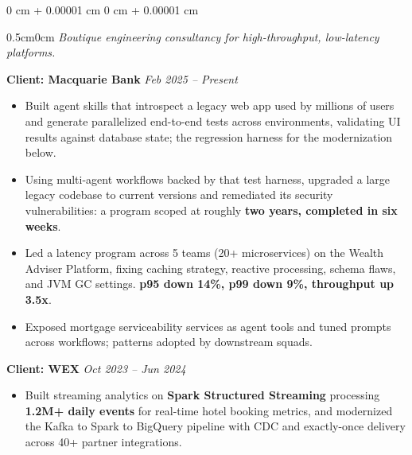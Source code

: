 \documentclass[10pt, letterpaper]{article}
\newenvironment{onecolentry}{
    \begin{adjustwidth}{
        0 cm + 0.00001 cm
    }{
        0 cm + 0.00001 cm
    }
}{
    \end{adjustwidth}
} %
\begin{document}
        \vspace{0.10 cm}
        \begin{onecolentry}
            \begin{adjustwidth}{0.5cm}{0cm}
            \textit{Boutique engineering consultancy for high-throughput, low-latency platforms.}
            \end{adjustwidth}

            \vspace{0.10 cm}
            \hspace{0.5cm}\textbf{Client: Macquarie Bank} \hfill \textit{Feb 2025 -- Present}
            \begin{itemize}[
                topsep=0.10 cm,
                parsep=0.10 cm,
                partopsep=0pt,
                itemsep=0pt,
                leftmargin=0 cm + 10pt + 0.5cm
            ]
                \item Built agent skills that introspect a legacy web app used by millions of users and generate parallelized end-to-end tests across environments, validating UI results against database state; the regression harness for the modernization below.
                \item Using multi-agent workflows backed by that test harness, upgraded a large legacy codebase to current versions and remediated its security vulnerabilities: a program scoped at roughly \textbf{two years, completed in six weeks}.
                \item Led a latency program across 5 teams (20+ microservices) on the Wealth Adviser Platform, fixing caching strategy, reactive processing, schema flaws, and JVM GC settings. \textbf{p95 down 14\%, p99 down 9\%, throughput up 3.5x}.
                \item Exposed mortgage serviceability services as agent tools and tuned prompts across workflows; patterns adopted by downstream squads.
            \end{itemize}

            \vspace{0.10 cm}
            \hspace{0.5cm}\textbf{Client: WEX} \hfill \textit{Oct 2023 -- Jun 2024}
            \begin{itemize}[
                topsep=0.10 cm,
                parsep=0.10 cm,
                partopsep=0pt,
                itemsep=0pt,
                leftmargin=0 cm + 10pt + 0.5cm
            ]
            \item Built streaming analytics on \textbf{Spark Structured Streaming} processing \textbf{1.2M+ daily events} for real-time hotel booking metrics, and modernized the Kafka to Spark to BigQuery pipeline with CDC and exactly-once delivery across 40+ partner integrations.
            \end{itemize}


\end{onecolentry}
\end{document}
